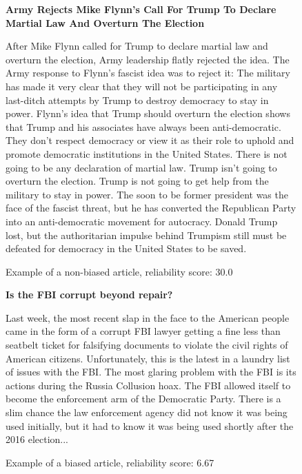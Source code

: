 \begin{figure}[htbp]
    \centering
    \begin{minipage}{1\linewidth}
        \begin{center}
            \small{\textbf{Army Rejects Mike Flynn’s Call For Trump To Declare Martial Law And Overturn The Election}}
        \end{center}
        \scriptsize{
            After Mike Flynn called for Trump to declare martial law and overturn the election, Army leadership flatly rejected the idea. The Army response to Flynn’s fascist idea was to reject it: The military has made it very clear that they will not be participating in any last-ditch attempts by Trump to destroy democracy to stay in power. Flynn’s idea that Trump should overturn the election shows that Trump and his associates have always been anti-democratic. They don’t respect democracy or view it as their role to uphold and promote democratic institutions in the United States. There is not going to be any declaration of martial law. Trump isn’t going to overturn the election. Trump is not going to get help from the military to stay in power. The soon to be former president was the face of the fascist threat, but he has converted the Republican Party into an anti-democratic movement for autocracy. Donald Trump lost, but the authoritarian impulse behind Trumpism still must be defeated for democracy in the United States to be saved.}
    \end{minipage}
    \caption{Example of a non-biased article, reliability score: 30.0}
    \label{fig:example-mixed-biased-article-1}
\end{figure}

\begin{figure}[htbp]
    \centering
    \begin{minipage}{1\linewidth}
        \begin{center}
            \small{\textbf{Is the FBI corrupt beyond repair?}}
        \end{center}
        \scriptsize{
            Last week, the most recent slap in the face to the American people came in the form of a corrupt FBI lawyer getting a fine less than seatbelt ticket for falsifying documents to violate the civil rights of American citizens. Unfortunately, this is the latest in a laundry list of issues with the FBI. The most glaring problem with the FBI is its actions during the Russia Collusion hoax. The FBI allowed itself to become the enforcement arm of the Democratic Party. There is a slim chance the law enforcement agency did not know it was being used initially, but it had to know it was being used shortly after the 2016 election...
        }
    \end{minipage}
    \caption{Example of a biased article, reliability score: 6.67}
    \label{fig:example-biased-article-1}
\end{figure}

